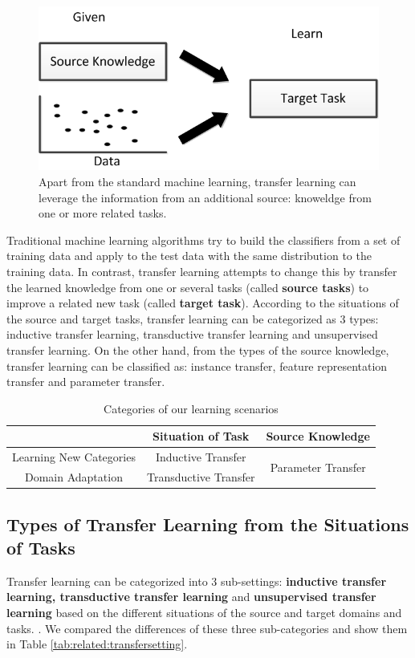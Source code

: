 \begin{figure}
	\centering
	\includegraphics[scale =.7]{relatedwork/fig/transfer.png}
	\caption{Apart from the standard machine learning, transfer learning can leverage the information from an additional source: knoweldge from one or more related tasks.}
\end{figure}

Traditional machine learning algorithms try to build the classifiers from a set of training data and apply to the test data with the same distribution to the training data. In contrast, transfer learning attempts to change this by transfer the learned knowledge from one or several tasks (called \textbf{source tasks}) to improve a related new task (called \textbf{target task}). According to the situations of the source and target tasks, transfer learning can be categorized as 3 types: inductive transfer learning, transductive transfer learning and {unsupervised transfer learning}. On the other hand, from the types of the source knowledge, transfer learning can be classified as: instance transfer, feature representation transfer and parameter transfer. 

\begin{table}[htbp]
	\centering
	\caption{Categories of our learning scenarios}
	\begin{tabular}{|c|c|c|}
		\hline
		& Situation of Task     & Source Knowledge \\
		\hline
		Learning New Categories & Inductive Transfer & \multirow{2}[0]{*}{Parameter Transfer} \\
		\cline{1-2}
		Domain Adaptation & Transductive Transfer &  \\
		\hline
	\end{tabular}%
\end{table}%


\subsection{Types of Transfer Learning from the Situations of Tasks}
Transfer learning can be categorized into 3 sub-settings: \textbf{inductive transfer learning, transductive transfer learning} and \textbf{unsupervised transfer learning} based on the different situations of the source and target domains and tasks. \cite{pan2010survey}. We compared the differences of these three sub-categories and show them in Table \ref{tab:related:transfersetting}. 

